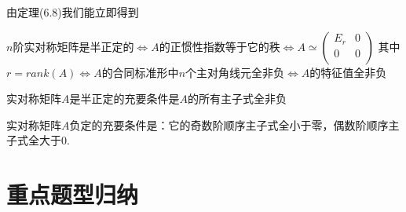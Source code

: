 \documentclass[lang=cn,10pt]{elegantbook}
\begin{document}
由定理(6.8)我们能立即得到
\begin{corollary}
	$n$阶实对称矩阵是半正定的$\Longleftrightarrow$$A$的正惯性指数等于它的秩$\Longleftrightarrow$$A\simeq\left( \begin{matrix}
		E_r&		0\\
		0&		0\\
	\end{matrix} \right)$
	其中$r=rank(A)$$\Longleftrightarrow$$A$的合同标准形中$n$个主对角线元全非负$\Longleftrightarrow$$A$的特征值全非负
\end{corollary}
\begin{theorem}
	实对称矩阵$A$是半正定的充要条件是$A$的所有主子式全非负
\end{theorem}
\begin{theorem}
	实对称矩阵$A$负定的充要条件是：它的奇数阶顺序主子式全小于零，偶数阶顺序主子式全大于0.
\end{theorem}
\section{重点题型归纳}
\end{document}
